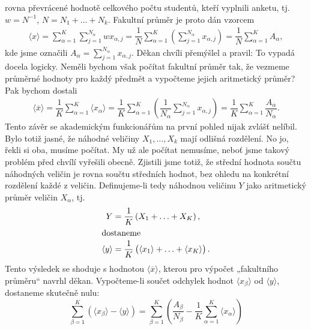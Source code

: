 \begin{mdframed}[style=mdexam]
\begin{example}
    rovna převrácené hodnotě celkového počtu studentů, kteří vyplnili anketu, tj. \(w = N^{-1}\),
    \(N = N_1 + \ldots + N_k\). Fakultní průměr je proto dán vzorcem
    \begin{gather*}
      \langle x \rangle 
        = \sum_{\alpha=1}^{K}\sum_{j=1}^{N_\alpha}wx_{\alpha,j} 
        = \dfrac{1}{N}\sum_{\alpha=1}^{K}\left(\sum_{j=1}^{N_\alpha}x_{\alpha,j}\right)
        = \dfrac{1}{N}\sum_{\alpha=1}^{K}A_\alpha,
    \end{gather*}
    kde jsme označili \(A_\alpha = \sum_{j=1}^{N_\alpha}x_{\alpha,j}\). Děkan chvíli přemýšlel a
    pravil: To vypadá docela logicky. Neměli bychom však počítat fakultní průměr tak, že vezmeme
    průměrné hodnoty pro každý předmět a vypočteme jejich aritmetický průměr? Pak bychom dostali
    \begin{gather*}
      \langle \overline{x} \rangle
        = \dfrac{1}{K}\sum_{\alpha=1}^{K}\langle x_{\alpha}\rangle
        = \dfrac{1}{K}\sum_{\alpha=1}^{K}
          \left(\dfrac{1}{N_\alpha}\sum_{j=1}^{N_\alpha}x_{\alpha,j}\right)
        = \dfrac{1}{K}\sum_{\alpha=1}^{K}\dfrac{A_\alpha}{N_\alpha}.
    \end{gather*}
    Tento závěr se akademickým funkcionářům na první pohled nijak zvlášť nelíbil. Bylo totiž jasné,
    že náhodné veličiny \(X_1, \ldots, X_k\) mají odlišná rozdělení. No jo, řekli si oba, musíme
    počítat. My už ale počítat nemusíme, neboť jsme takový problém před chvílí vyřešili obecně.
    Zjistili jsme totiž, že střední hodnota součtu náhodných veličin je rovna součtu středních
    hodnot, bez ohledu na konkrétní rozdělení každé z veličin. Definujeme-li tedy náhodnou veličinu
    \(Y\) jako aritmetický průměr veličin \(X_\alpha\), tj.
    \begin{align*}
      Y &= \dfrac{1}{K}\left(X_1 + \ldots + X_K\right),  \\
      \shortintertext{dostaneme}
      \langle y \rangle &= \dfrac{1}{K}\left(\langle x_1 \rangle +\ldots+\langle x_K \rangle\right).
    \end{align*}
    Tento výsledek se shoduje s hodnotou \(\langle \overline{x} \rangle\), kterou pro výpočet
    „fakultního průměru“ navrhl děkan. Vypočteme-li součet odchylek hodnot \(\langle x_\beta
    \rangle\) od \(\langle y \rangle\), dostaneme skutečně nulu:
    \begin{equation*}
      \sum_{\beta =1}^{K}\left(\langle x_\beta \rangle - \langle y \rangle\right)
        = \sum_{\beta =1}^{K}\left(\dfrac{A_\beta}{N_\beta} 
        - \dfrac{1}{K}\sum_{\alpha=1}^{K}\langle x_\alpha \rangle\right)

\end{equation*}
\end{example}
\end{mdframed}
